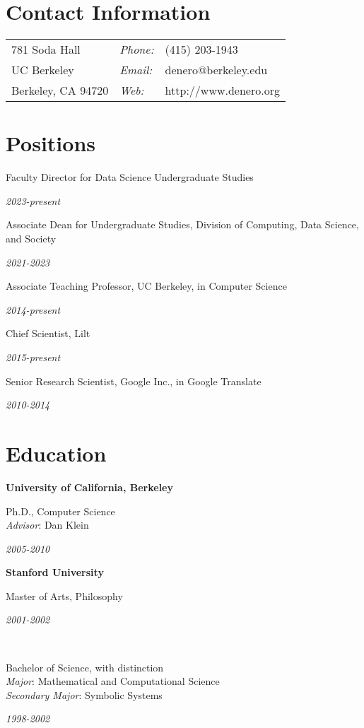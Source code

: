 \documentclass[margin,line]{res}
\newcommand{\dated}[2]{\parbox[t]{4.4in}{#1} \hspace{0.4in}
											 \parbox[t]{1in}{ {\it #2 } } }
\begin{document}

\begin{resume}

\section{\sc Contact Information}
\vspace{.05in}
\begin{tabular}{@{}p{2in}lp{4in}}
781 Soda Hall         & {\it Phone:} & (415) 203-1943        \\
UC Berkeley           & {\it Email:} & denero@berkeley.edu   \\
Berkeley, CA  94720   & {\it Web:}   & http://www.denero.org \\
\end{tabular}

\section{\sc Positions}

	\dated{Faculty Director for Data Science Undergraduate Studies}
	{ 2023-present }

	\dated{Associate Dean for Undergraduate Studies, Division of Computing, Data Science, and Society}
	{ 2021-2023 }

	\dated{Associate Teaching Professor, UC Berkeley, in Computer Science}
	{ 2014-present }

	\dated{Chief Scientist, Lilt} { 2015-present } 

	\dated{Senior Research Scientist, Google Inc., in Google Translate}
	{ 2010-2014 }

\section{\sc Education}

	{\bf University of California, Berkeley} \\
	\dated{Ph.D., Computer Science \\
	\hspace*{1em} {\it Advisor}: Dan Klein}{ 2005-2010 }

	{\bf Stanford University} \\
	\dated{Master of Arts, Philosophy\vspace{0.12in}}{ 2001-2002 } \\
	\dated{Bachelor of Science, with distinction \\
	\hspace*{1em} {\it Major}: Mathematical and Computational Science \\
	\hspace*{1em} {\it Secondary Major}: Symbolic Systems}{ 1998-2002 }


\end{resume}
\end{document}
